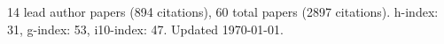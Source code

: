 14 lead author papers (894 citations),
60 total papers (2897 citations).\newline
h-index: 31, g-index: 53, i10-index: 47. Updated \today.